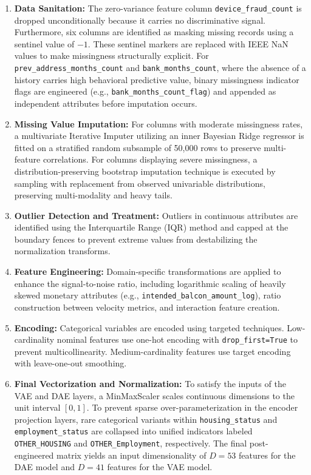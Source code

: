 \begin{enumerate}[leftmargin=2em]
    \item \textbf{Data Sanitation:} The zero-variance feature column \texttt{device\_fraud\_count} is dropped unconditionally because it carries no discriminative signal. Furthermore, six columns are identified as masking missing records using a sentinel value of $-1$. These sentinel markers are replaced with IEEE NaN values to make missingness structurally explicit. For \texttt{prev\_address\_months\_count} and \texttt{bank\_months\_count}, where the absence of a history carries high behavioral predictive value, binary missingness indicator flags are engineered (e.g., \texttt{bank\_months\_count\_flag}) and appended as independent attributes before imputation occurs.

    \item \textbf{Missing Value Imputation:} For columns with moderate missingness rates, a multivariate Iterative Imputer utilizing an inner Bayesian Ridge regressor is fitted on a stratified random subsample of 50,000 rows to preserve multi-feature correlations. For columns displaying severe missingness, a distribution-preserving bootstrap imputation technique is executed by sampling with replacement from observed univariable distributions, preserving multi-modality and heavy tails.

    \item \textbf{Outlier Detection and Treatment:} Outliers in continuous attributes are identified using the Interquartile Range (IQR) method and capped at the boundary fences to prevent extreme values from destabilizing the normalization transforms.

    \item \textbf{Feature Engineering:} Domain-specific transformations are applied to enhance the signal-to-noise ratio, including logarithmic scaling of heavily skewed monetary attributes (e.g., \texttt{intended\_balcon\_amount\_log}), ratio construction between velocity metrics, and interaction feature creation.

    \item \textbf{Encoding:} Categorical variables are encoded using targeted techniques. Low-cardinality nominal features use one-hot encoding with \texttt{drop\_first=True} to prevent multicollinearity. Medium-cardinality features use target encoding with leave-one-out smoothing.

    \item \textbf{Final Vectorization and Normalization:} To satisfy the inputs of the VAE and DAE layers, a MinMaxScaler scales continuous dimensions to the unit interval $[0, 1]$. To prevent sparse over-parameterization in the encoder projection layers, rare categorical variants within \texttt{housing\_status} and \texttt{employment\_status} are collapsed into unified indicators labeled \texttt{OTHER\_HOUSING} and \texttt{OTHER\_Employment}, respectively. The final post-engineered matrix yields an input dimensionality of $D = 53$ features for the DAE model and $D = 41$ features for the VAE model.
\end{enumerate}

